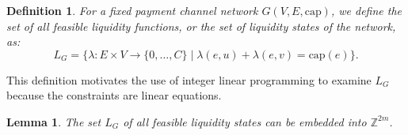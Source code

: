 \documentclass[10pt,twocolumn]{article}
\newtheorem{definition}{Definition}[section]
\newtheorem{lemma}[theorem]{Lemma}
\begin{document}
  



\begin{definition}
For a fixed payment channel network \( G(V,E, \text{cap}) \), we define the set of all feasible liquidity functions, or the set of liquidity states of the network, as:
\[ L_G = \{\lambda: E \times V \longrightarrow \{0, \dots, C\} \mid \lambda(e,u) + \lambda(e,v) = \text{cap}(e) \}. \]
\end{definition}
This definition motivates the use of integer linear programming to examine \(L_G\) because the constraints are linear equations.
\begin{lemma}
The set \( L_G \) of all feasible liquidity states can be embedded into \(\mathbb{Z}^{2m}\).
\end{lemma}
\end{document}
